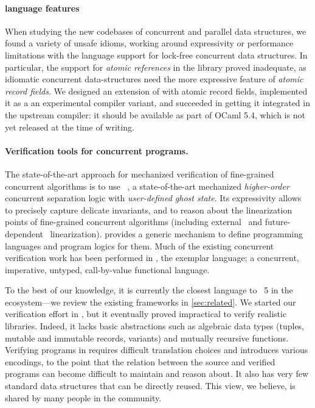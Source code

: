 \paragraph{\OCaml language features} When studying the new codebases
of concurrent and parallel data structures, we found a variety of
unsafe idioms, working around expressivity or performance limitations
with the \OCaml language support for lock-free concurrent data
structures. In particular, the support for \emph{atomic references} in
the \OCaml library proved inadequate, as idiomatic concurrent
data-structures need the more expressive feature of \emph{atomic
  record fields}. We designed an extension of \OCaml with atomic
record fields, implemented it as a an experimental compiler variant,
and succeeded in getting it integrated in the upstream \OCaml
compiler: it should be available as part of OCaml 5.4, which is not
yet released at the time of writing.

\paragraph{Verification tools for concurrent programs.} The state-of-the-art approach for mechanized verification of fine-grained concurrent algorithms is to use \Iris~\citep*{DBLP:journals/jfp/JungKJBBD18}, a state-of-the-art mechanized \emph{higher-order} concurrent separation logic with \emph{user-defined ghost state}. Its expressivity allows to precisely capture delicate invariants, and to reason about the linearization points of fine-grained concurrent algorithms (including external~\citep*{DBLP:conf/cpp/VindumFB22} and future-dependent~\citep*{DBLP:journals/pacmpl/JungLPRTDJ20,DBLP:conf/cpp/VindumB21,DBLP:conf/osdi/Chang0STKZ23} linearization). \Iris provides a generic mechanism to define programming languages and program logics for them. Much of the existing \Iris concurrent verification work has been performed in \HeapLang, the exemplar \Iris language; a concurrent, imperative, untyped, call-by-value functional language.

To the best of our knowledge, it is currently the closest language to \OCaml~5 in the \Iris ecosystem---we review the existing frameworks in \cref{sec:related}. We started our verification effort in \HeapLang, but it eventually proved impractical to verify realistic \OCaml libraries.
Indeed, it lacks basic abstractions such as algebraic data types (tuples, mutable and immutable records, variants) and mutually recursive functions.
Verifying \OCaml programs in \HeapLang requires difficult translation choices and introduces various encodings, to the point that the relation between the source and verified programs can become difficult to maintain and reason about.
It also has very few standard data structures that can be directly reused.
This view, we believe, is shared by many people in the \Iris community.

